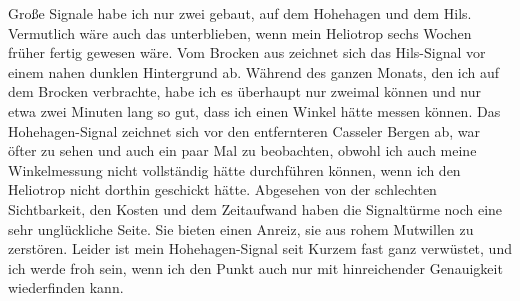\par\noindent\hspace*{\parindent}Große Signale habe ich nur zwei gebaut, auf dem Hohehagen und dem Hils. Vermutlich wäre auch das unterblieben, wenn mein Heliotrop sechs Wochen früher fertig gewesen wäre.
Vom Brocken aus zeichnet sich das Hils-Signal vor einem nahen dunklen Hintergrund ab. Während des ganzen Monats, den ich auf dem Brocken verbrachte, habe ich es überhaupt nur zweimal  können und nur etwa zwei Minuten lang so gut, dass ich einen Winkel hätte messen können. Das Hohehagen-Signal zeichnet sich vor den entfernteren Casseler Bergen ab, war öfter zu sehen und auch ein paar Mal zu beobachten, obwohl ich auch meine Winkelmessung nicht vollständig hätte durchführen können, wenn ich den Heliotrop nicht dorthin geschickt hätte.
Abgesehen von der schlechten Sichtbarkeit, den Kosten und dem Zeitaufwand haben die Signaltürme noch eine sehr unglückliche Seite. Sie bieten einen Anreiz, sie aus rohem Mutwillen zu zerstören.
Leider ist mein Hohehagen-Signal seit Kurzem fast ganz verwüstet, und ich werde froh sein, wenn ich den Punkt auch nur mit hinreichender Genauigkeit wiederfinden kann.

